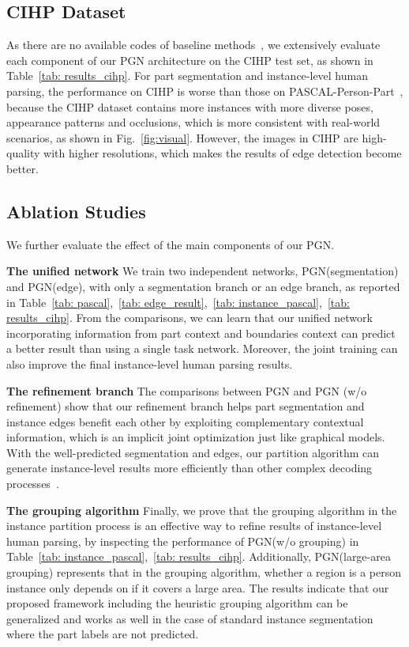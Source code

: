 \documentclass[runningheads]{llncs}
\begin{document}
\subsection{CIHP Dataset}
As there are no available codes of baseline methods~\cite{li2017holistic}, we extensively evaluate each component of our PGN architecture on the CIHP test set, as shown in Table~\ref{tab: results_cihp}. For part segmentation and instance-level human parsing, the performance on CIHP is worse than those on PASCAL-Person-Part~\cite{chen2014detect}, because the CIHP dataset contains more instances with more diverse poses, appearance patterns and occlusions, which is more consistent with real-world scenarios, as shown in Fig.~\ref{fig:visual}. However, the images in CIHP are high-quality with higher resolutions, which makes the results of edge detection become better.




\subsection{Ablation Studies}
We further evaluate the effect of the main components of our PGN.

\textbf{The unified network} We train two independent networks, PGN(segmentation) and PGN(edge), with only a segmentation branch or an edge branch, as reported in Table~\ref{tab: pascal},~\ref{tab: edge_result},~\ref{tab: instance_pascal},~\ref{tab: results_cihp}. From the comparisons, we can learn that our unified network incorporating information from part context and boundaries context can predict a better result than using a single task network. Moreover, the joint training can also improve the final instance-level human parsing results. 

\textbf{The refinement branch} The comparisons between PGN and PGN (w/o refinement) show that our refinement branch helps part segmentation and instance edges benefit each other by exploiting complementary contextual information, which is an implicit joint optimization just like graphical models. With the well-predicted segmentation and edges, our partition algorithm can generate instance-level results more efficiently than other complex decoding processes~\cite{li2017holistic,Liu_2017_ICCV,Arnab_2017_CVPR}.

\textbf{The grouping algorithm} Finally, we prove that the grouping algorithm in the instance partition process is an effective way to refine results of instance-level human parsing, by inspecting the performance of PGN(w/o grouping) in Table~\ref{tab: instance_pascal},~\ref{tab: results_cihp}. Additionally, PGN(large-area grouping) represents that in the grouping algorithm, whether a region is a person instance only depends on if it covers a large area. The results indicate that our proposed framework including the heuristic grouping algorithm can be generalized and works as well in the case of standard instance segmentation where the part labels are not predicted.
\end{document}

